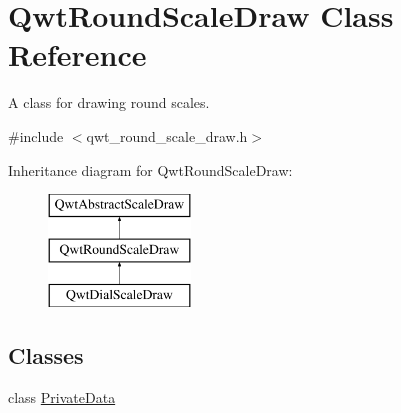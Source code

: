 \hypertarget{class_qwt_round_scale_draw}{\section{Qwt\-Round\-Scale\-Draw Class Reference}
\label{class_qwt_round_scale_draw}
}


A class for drawing round scales.  




{\ttfamily \#include $<$qwt\-\_\-round\-\_\-scale\-\_\-draw.\-h$>$}

Inheritance diagram for Qwt\-Round\-Scale\-Draw\-:\begin{figure}[H]
\begin{center}
\leavevmode
\includegraphics[height=3.000000cm]{class_qwt_round_scale_draw}
\end{center}
\end{figure}
\subsection*{Classes}
\begin{DoxyCompactItemize}
\item 
class \hyperlink{class_qwt_round_scale_draw_1_1_private_data}{Private\-Data}
\end{DoxyCompactItemize}
